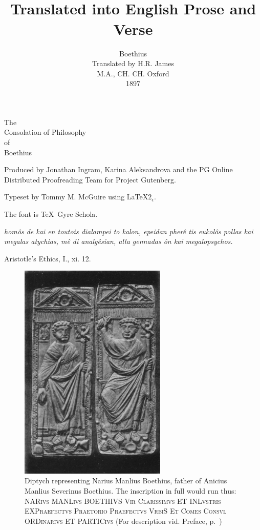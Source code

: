 \documentclass[11pt]{book}
\title{\simpletitle \\[1em] {\small Translated into English Prose and Verse}}
\author{Boethius \\[2em] Translated by H.R. James \\ {\small M.A., CH. CH. Oxford} \\[2em] 1897}
\date{}
\newcommand{\simpletitle}{The \\ Consolation of Philosophy \\ of \\ Boethius}
\begin{document}
\setlength{\baselineskip}{1.2\baselineskip}

\frontmatter

\thispagestyle{empty}
\hspace{0pt}
\vfill
\begin{center}
  \Large
  \simpletitle
\end{center}
\vfill
\pagebreak

\thispagestyle{empty}
\hspace{0pt}
\vfill

\noindent Produced by Jonathan Ingram, Karina Aleksandrova and the PG Online Distributed Proofreading Team for Project Gutenberg.

\noindent Typeset by Tommy M. McGuire using \LaTeX $2_\epsilon$.

\noindent The font is \TeX\ Gyre Schola.

\pagebreak

\thispagestyle{empty}
\hspace{0pt}
\vfill


\noindent \emph{homôs de kai en toutois dialampei to kalon, epeidan pherê tis eukolôs pollas kai megalas atychias, mê di analgêsian, alla gennadas ôn kai \mbox{megalopsychos.}}

Aristotle's Ethics, I., xi. 12.

\vfill

\pagebreak
\thispagestyle{empty}
\hspace{0pt}
\vfill

\begin{figure}[ht!]
\centering
\includegraphics[width=70mm]{image01.jpg}
\caption{Diptych representing Narius Manlius Boethius, father of
Anicius Manlius Severinus Boethius. The inscription in full would run
thus: \textsc{NARivs MANLivs BOETHIVS Vir Clarissimvs ET INLvstris
EXPraefectvs Praetorio Praefectvs VrbiS Et Comes Consvl ORDinarivs ET
PARTICivs} (For description vid. Preface, p.~\pageref{diptych})}
\end{figure}
\end{document}
